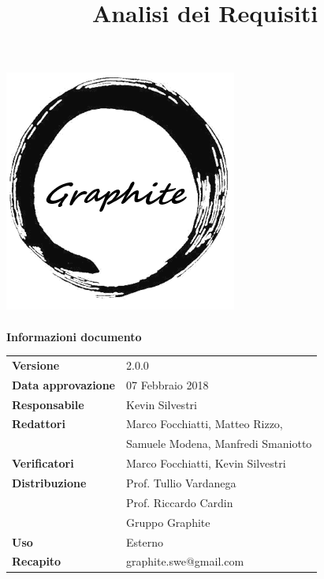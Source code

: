 \label{key}\documentclass[openany,12pt,a4paper]{report}
\title{Analisi dei Requisiti}
\author{}
\newcommand{\versione}{2.0.0}
\begin{document}
	
	\makeatletter
	\begin{titlepage}
		\setlength{\headsep}{0pt}  
		\begin{center}			
			\includegraphics[width=0.5\linewidth]{Logo.png}\\[1em]
			{\huge \bfseries  \@title }\\[10ex]
			\textbf{\Large Informazioni documento} \\[2em]
			\bgroup
			\def\arraystretch{1.5}
			\begin{tabular}{l|l}
				\textbf{Versione} & \versione{} \\
				\textbf{Data approvazione} & 07 Febbraio 2018 \\
				\textbf{Responsabile} & Kevin Silvestri \\
				\textbf{Redattori} & Marco Focchiatti, Matteo Rizzo,\\
				& Samuele Modena, Manfredi Smaniotto \\
				\textbf{Verificatori} & Marco Focchiatti, Kevin Silvestri \\
				\textbf{Distribuzione} & Prof. Tullio Vardanega \\
				 & Prof. Riccardo Cardin \\
				 & Gruppo Graphite \\
				\textbf{Uso} & Esterno \\
				\textbf{Recapito} & graphite.swe@gmail.com \\
			\end{tabular}
		\egroup
		\end{center}
	\end{titlepage}
	\makeatother

	\thispagestyle{empty}
	\newpage
	
	
	
	\tableofcontents
	\listoffigures
	\listoftables
	
	
	
	
	
	
	
\end{document}
